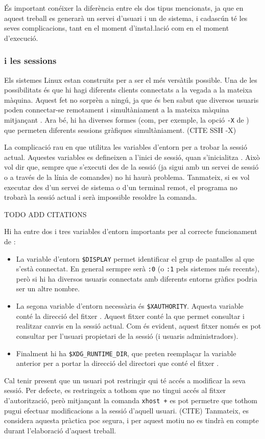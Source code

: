 És important conéixer la diferència entre els dos tipus mencionats, ja que en
aquest treball es generarà un servei d'usuari i un de sistema, i cadascún té
les seves complicacions, tant en el moment d'insta\l.lació com en el moment
d'execució.

\subsubsection{ i les sessions}

Els sistemes Linux estan construits per a ser el més versàtils possible. Una
de les possibilitats és que hi hagi diferents clients connectats a la vegada
a la mateixa màquina. Aquest fet no sorprèn a ningú, ja que és ben sabut que
diversos usuaris poden connectar-se remotament i simultàniament a la mateixa
màquina mitjançant . Ara bé, hi ha diverses formes (com, per exemple,
la opció \verb|-X| de ) que permeten diferents sessions gràfiques
simultàniament. (CITE SSH -X)

La complicació rau en que  utilitza les variables d'entorn per a
trobar la sessió actual. Aquestes variables es defineixen a l'inici de sessió,
quan s'inicialitza . Això vol dir que, sempre que s'executi
 des de la sessió (ja sigui amb un servei de sessió o a través de
la línia de comandes) no hi haurà problema.
Tanmateix, si es vol executar  des d'un servei de sistema o d'un
terminal remot, el programa no trobarà la sessió actual i serà impossible
resoldre la comanda.

TODO ADD CITATIONS

Hi ha entre dos i tres variables d'entorn importants per al correcte funcionament
de :

\begin{itemize}
    \item La variable d'entorn \verb|$DISPLAY| permet identificar el grup de
    pantalles al que s'està connectat. En general sermpre serà \verb|:0| (o 
    \verb|:1| pels sistemes més recents), però si hi ha diversos usuaris
    connectats amb diferents entorns gràfics podria ser un altre nombre.
    \item La segona variable d'entorn necessària és \verb|$XAUTHORITY|. Aquesta
    variable conté la direcció del fitxer . Aquest fitxer
    conté la  que permet consultar i realitzar canvis en la sessió
    actual. Com és evident, aquest fitxer només es pot consultar per l'usuari
    propietari de la sessió (i usuaris administradors).
    \item Finalment hi ha \verb|$XDG_RUNTIME_DIR|, que preten reemplaçar la
    variable anterior per a portar la direcció del directori que conté el fitxer
    .
\end{itemize}

Cal tenir present que un usuari pot restringir qui té accés a modificar la
seva sessió. Per defecte, es restringeix a tothom que no tingui accés al
fitxer d'autorització, però mitjançant la comanda \verb|xhost +| es pot permetre
que tothom pugui efectuar modificacions a la sessió d'aquell usuari. (CITE)
Tanmateix, es considera aquesta pràctica poc segura, i per aquest motiu no es
tindrà en compte durant l'elaboració d'aquest treball.

